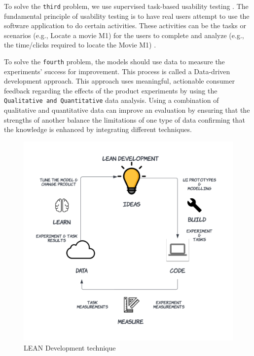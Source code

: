 To solve the \texttt{third} problem, we use supervised task-based usability testing \cite{article:dataanalysis:supervisedtest}.
The fundamental principle of usability testing is to have real users attempt to use the software application to do certain activities.
These activities can be the tasks or scenarios (e.g., Locate a movie M1) for the users to complete and analyze (e.g., the time/clicks required to locate the Movie M1) \cite{misc:usability:tasks}.

To solve the \texttt{fourth} problem, the models should use data to measure the experiments' success for improvement. This process is called a Data-driven development approach. 
This approach uses meaningful, actionable consumer feedback regarding the effects of the product experiments by using the \texttt{Qualitative and Quantitative} data analysis.
Using a combination of qualitative and quantitative data can improve an evaluation by ensuring that the strengths of another balance the limitations of one type of data confirming that the knowledge is enhanced by integrating different techniques.

\begin{figure}[ht]
    \centering
    \includegraphics[scale=0.15]{images/solution-ideas/LEAN.png}
    \caption{LEAN Development technique}
    \label{intro:fig:lean}
\end{figure}
\par

